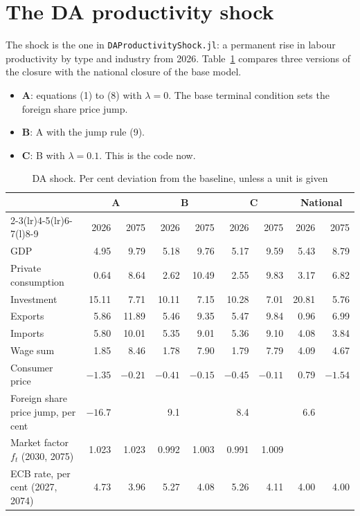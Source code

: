 \documentclass[11pt,a4paper]{article}
\newcommand{\code}[1]{\texttt{#1}}
\begin{document}
\section{The DA productivity shock}

The shock is the one in \code{DAProductivityShock.jl}: a permanent rise in labour productivity by type and industry from 2026.
Table~\ref{tab:results} compares three versions of the closure with the national closure of the base model.
\begin{itemize}
\item \textbf{A}: equations (1) to (8) with $\lambda = 0$. The base terminal condition sets the foreign share price jump.
\item \textbf{B}: A with the jump rule (9).
\item \textbf{C}: B with $\lambda = 0.1$. This is the code now.
\end{itemize}

\begin{table}[ht]
\centering
\small
\caption{DA shock. Per cent deviation from the baseline, unless a unit is given}
\label{tab:results}
\begin{tabular}{@{}lrrrrrrrr@{}}
\toprule
 & \multicolumn{2}{c}{A} & \multicolumn{2}{c}{B} & \multicolumn{2}{c}{C} & \multicolumn{2}{c}{National} \\
\cmidrule(lr){2-3}\cmidrule(lr){4-5}\cmidrule(lr){6-7}\cmidrule(l){8-9}
 & 2026 & 2075 & 2026 & 2075 & 2026 & 2075 & 2026 & 2075 \\
\midrule
GDP & 4.95 & 9.79 & 5.18 & 9.76 & 5.17 & 9.59 & 5.43 & 8.79 \\
Private consumption & 0.64 & 8.64 & 2.62 & 10.49 & 2.55 & 9.83 & 3.17 & 6.82 \\
Investment & 15.11 & 7.71 & 10.11 & 7.15 & 10.28 & 7.01 & 20.81 & 5.76 \\
Exports & 5.86 & 11.89 & 5.46 & 9.35 & 5.47 & 9.84 & 0.96 & 6.99 \\
Imports & 5.80 & 10.01 & 5.35 & 9.01 & 5.36 & 9.10 & 4.08 & 3.84 \\
Wage sum & 1.85 & 8.46 & 1.78 & 7.90 & 1.79 & 7.79 & 4.09 & 4.67 \\
Consumer price & $-1.35$ & $-0.21$ & $-0.41$ & $-0.15$ & $-0.45$ & $-0.11$ & 0.79 & $-1.54$ \\
\midrule
Foreign share price jump, per cent & $-16.7$ & & 9.1 & & 8.4 & & 6.6 & \\
Market factor $f_t$ (2030, 2075) & 1.023 & 1.023 & 0.992 & 1.003 & 0.991 & 1.009 & & \\
ECB rate, per cent (2027, 2074) & 4.73 & 3.96 & 5.27 & 4.08 & 5.26 & 4.11 & 4.00 & 4.00 \\
\bottomrule
\end{tabular}
\end{table}
\end{document}
